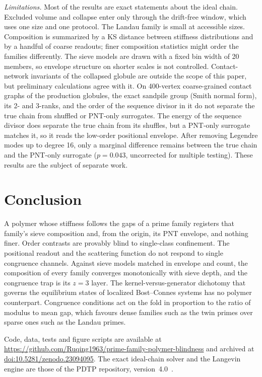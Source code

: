 \documentclass[reprint,amsmath,amssymb,aps,pre,longbibliography]{revtex4-2}
\begin{document}
\emph{Limitations.} Most of the results are exact statements about the ideal chain. Excluded volume
and collapse enter only through the drift-free window, which uses one size and one protocol. The
Landau family is small at accessible sizes. Composition is summarized by a KS distance between
stiffness distributions and by a handful of coarse readouts; finer composition statistics might
order the families differently. The sieve models are drawn with a fixed bin width of 20 members,
so envelope structure on shorter scales is not controlled. Contact-network invariants of the
collapsed globule are outside the scope of this paper, but preliminary calculations agree with it.
On 400-vertex coarse-grained contact graphs of the production globules, the exact sandpile group
(Smith normal form), its 2- and 3-ranks, and the order of the sequence divisor in it do not separate
the true chain from shuffled or PNT-only surrogates. The energy of the sequence divisor does
separate the true chain from its shuffles, but a PNT-only surrogate matches it, so it reads the
low-order positional envelope. After removing Legendre modes up to degree 16, only a marginal
difference remains between the true chain and the PNT-only surrogate ($p=0.043$, uncorrected for
multiple testing). These results are the subject of separate work.

\section{Conclusion}

A polymer whose stiffness follows the gaps of a prime family registers that family's sieve
composition and, from the origin, its PNT envelope, and nothing finer. Order contrasts are
provably blind to single-class confinement. The positional readout and the scattering function
do not respond to single congruence channels. Against sieve models matched in envelope and
count, the composition of every family converges monotonically with sieve depth, and the
congruence trap is its $z=3$ layer. The kernel-versus-generator dichotomy that governs the
equilibrium states of localized Bost--Connes systems has no polymer counterpart. Congruence
conditions act on the fold in proportion to the ratio of modulus to mean gap, which favours
dense families such as the twin primes over sparse ones such as the Landau primes.

\begin{acknowledgments}
Code, data, tests and figure scripts are available at
\url{https://github.com/Ruqing1963/prime-family-polymer-blindness} and archived at
\href{https://doi.org/10.5281/zenodo.23094095}{doi:10.5281/zenodo.23094095}. The exact ideal-chain solver
and the Langevin engine are those of the PDTP repository, version~4.0~\cite{PDTP4}.
\end{acknowledgments}


\end{document}
